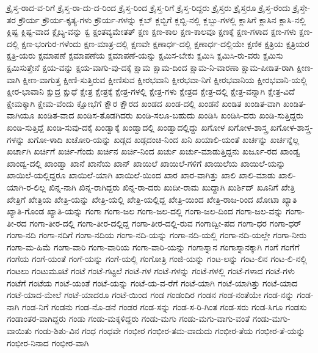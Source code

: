{ಕ್ರೈಸ್ತ-ರಾದ-ವ-ರಿಗೆ
ಕ್ರೈಸ್ತ-ರಾ-ದು-ದ-ರಿಂದ
ಕ್ರೈಸ್ತ-ರಿಂದ
ಕ್ರೈಸ್ತ-ರಿಗೆ
ಕ್ರೈಸ್ತ-ರಿದ್ದರು
ಕ್ರೈಸ್ತರು
ಕ್ರೈಸ್ತರೂ
ಕ್ರೈಸ್ತ-ರೆಂದು
ಕ್ರೈಸ್ತೇ-ತರ
ಕ್ರೌರ್ಯ
ಕ್ರೌರ್ಯ-ಕೃತ್ಯ-ಗಳು
ಕ್ರೌರ್ಯ-ಗಳನ್ನು
ಕ್ಲಬ್
ಕ್ಲಬ್ಬಿಗೆ
ಕ್ಲಬ್ಬಿ-ನಲ್ಲಿ
ಕ್ಲಬ್ಬು-ಗಳಲ್ಲಿ
ಕ್ಲಾಸಿಗೆ
ಕ್ಲಾಸಿನ
ಕ್ಲಾಸಿ-ನಲ್ಲಿ
ಕ್ಲಿಷ್ಟ
ಕ್ಲಿಷ್ಟ-ವಾದ
ಕ್ಲೈಬ್ಯ-ವನ್ನು
ಕ್ವ
ಕ್ಷಂತವ್ಯಮೇತತ್
ಕ್ಷಣ
ಕ್ಷಣ-ಕಾಲ
ಕ್ಷಣ-ಕಾಲವೂ
ಕ್ಷಣಕ್ಕೆ
ಕ್ಷಣ-ಗಳಾದ
ಕ್ಷಣ-ಗಳು
ಕ್ಷಣ-ದಲ್ಲಿ
ಕ್ಷಣ-ಭಂಗುರ-ಗಳೆಂದು
ಕ್ಷಣ-ಮಾತ್ರ-ದಲ್ಲಿ
ಕ್ಷಣವೇ
ಕ್ಷಣಾರ್ಧ-ದಲ್ಲಿ
ಕ್ಷಣಾರ್ಧ-ದಲ್ಲಿಯೇ
ಕ್ಷಣಿಕ
ಕ್ಷತ್ರಿಯ
ಕ್ಷತ್ರಿಯರ
ಕ್ಷತ್ರಿ-ಯರು
ಕ್ಷಮಾಪಣೆ
ಕ್ಷಮಾಪಣೆಯ
ಕ್ಷಮಾಪಣೆ-ಯನ್ನು
ಕ್ಷಮಿಸ-ಬೇಕು
ಕ್ಷಮಿಸಿ
ಕ್ಷಮಿಸಿ-ರು-ವರು
ಕ್ಷಮಿಸು
ಕ್ಷಮಿಸುತ್ತೇನೆ
ಕ್ಷಯ-ವನ್ನು
ಕ್ಷಯ-ವಾಗು-ವು-ದಕ್ಕೆ
ಕ್ಷಾಮ
ಕ್ಷಾಮ-ದಿಂದ
ಕ್ಷಾಮ-ನಿ-ವಾರಣಾ
ಕ್ಷಾಮ-ಪೀಡಿತ-ರಾಗಿ
ಕ್ಷೀಣ-ವಾಗಿ
ಕ್ಷೀಣ-ವಾಗುತ್ತ
ಕ್ಷೀಣಿ-ಸುತ್ತಿರುವ
ಕ್ಷೀಣಿಸುವ
ಕ್ಷೀರಭವಾನಿ
ಕ್ಷೀರಭವಾ-ನಿಗೆ
ಕ್ಷೀರಭವಾನಿಯ
ಕ್ಷೀರಭವಾನಿ-ಯಲ್ಲಿ
ಕ್ಷೀರ-ಭಾವಾನಿ
ಕ್ಷುದ್ರ
ಕ್ಷುಧೆ
ಕ್ಷೇತ್ರ
ಕ್ಷೇತ್ರಕ್ಕೆ
ಕ್ಷೇತ್ರ-ಗಳಲ್ಲಿ
ಕ್ಷೇತ್ರ-ಗಳು
ಕ್ಷೇತ್ರದ
ಕ್ಷೇತ್ರ-ದಲ್ಲಿ
ಕ್ಷೇತ್ರ-ವನ್ನಾಗಿ
ಕ್ಷೇತ್ರ-ವಿದೆ
ಕ್ಷೇಮಕ್ಕಾಗಿ
ಕ್ಷೇಮ-ವೆಂದು
ಕ್ಷೋಭೆಗೆ
ಕ್ಷೌರ
ಕ್ಷೌರದ
ಖಂಡದ
ಖಂಡ-ದಲ್ಲಿ
ಖಂಡನೆ
ಖಂಡಿತ
ಖಂಡಿತ-ವಾಗಿ
ಖಂಡಿತ-ವಾಗಿಯೂ
ಖಂಡಿತ-ವಾದ
ಖಂಡಿಸ-ತೊಡಗಿದರು
ಖಂಡಿ-ಸಲೂ-ಬಹುದು
ಖಂಡಿಸಿ
ಖಂಡಿಸಿ-ದರು
ಖಂಡಿ-ಸುತ್ತಿದ್ದರು
ಖಂಡಿ-ಸುತ್ತಿದ್ದೆ
ಖಂಡಿ-ಸುವು-ದಕ್ಕೆ
ಖಂಡ್ವಾಕ್ಕೆ
ಖಂಡ್ವಾದಲ್ಲಿ
ಖಂಡ್ವಾದಲ್ಲಿದ್ದು
ಖಗೋಳ
ಖಗೋಳ-ಶಾಸ್ತ್ರ
ಖಗೋಳ-ಶಾಸ್ತ್ರ-ಗಳನ್ನು
ಖಗೋ-ಳಾದಿ
ಖಚೋರಿ-ಯನ್ನು
ಖಡ್ಗದ
ಖಡ್ಗದಂಚಿ-ನಿಂದ
ಖನಿ
ಖಯಾಲಿ-ಯಂತೆ
ಖರ್ಚನ್ನು
ಖರ್ಚನ್ನೆಲ್ಲ
ಖರ್ಚಾಗಿ
ಖರ್ಚಿಗೆ
ಖರ್ಚಿ-ಗೆಂದು
ಖರ್ಚಿನ
ಖರ್ಚಿ-ನಿಂದ
ಖರ್ಚು
ಖರ್ಚು-ಮಾಡುತ್ತಿದ್ದನು
ಖರ್ಜೂ-ರದ
ಖಾಂಡ್ವ
ಖಾಂಡ್ವ-ದಲ್ಲಿ
ಖಾಂಡ್ವಾ
ಖಾನೆ
ಖಾನೆಯ
ಖಾನ್
ಖಾಯಿಲೆ
ಖಾಯಿಲೆ-ಗಳಿಗೆ
ಖಾಯಿಲೆಯ
ಖಾಯಿಲೆ-ಯನ್ನು
ಖಾಯಿಲೆ-ಯಲ್ಲಿದ್ದರೂ
ಖಾಯಿಲೆ-ಯಾಗಿ
ಖಾಯಿಲೆ-ಯಿಂದ
ಖಾರ
ಖಾರ-ವಾಗಿತ್ತು
ಖಾಲಿ
ಖಾಲಿ-ಮಾಡು
ಖಾಲಿ-ಯಾಗಿ-ರ-ಲಿಲ್ಲ
ಖಿನ್ನ-ನಾಗಿ
ಖಿನ್ನ-ರಾಗಿದ್ದರು
ಖಿನ್ನ-ರಾ-ದರು
ಖುದೀ-ರಾಮ
ಖುದ್ದಾಗಿ
ಖುರ್ಶಿದ್
ಖೂನಿಗೆ
ಖೇತ್ರಿ
ಖೇತ್ರಿಗೆ
ಖೇತ್ರಿಯ
ಖೇತ್ರಿ-ಯನ್ನು
ಖೇತ್ರಿ-ಯಲ್ಲಿ
ಖೇತ್ರಿ-ಯಲ್ಲಿದ್ದ
ಖೇತ್ರಿ-ಯಿಂದ
ಖೇತ್ರಿ-ರಾಜ-ರಿಂದ
ಖೋಟಾ
ಖ್ಯಾತಿ
ಖ್ಯಾತಿ-ಗೊಂಡ
ಖ್ಯಾತಿ-ಯನ್ನು
ಗಂಗಾ
ಗಂಗಾ-ಜಲ
ಗಂಗಾ-ಜಲ-ದಲ್ಲಿ
ಗಂಗಾ-ಜಲ-ದಿಂದ
ಗಂಗಾ-ಜಲ-ವನ್ನು
ಗಂಗಾ-ತೀ-ರದ
ಗಂಗಾ-ತೀರ-ದಲ್ಲಿ
ಗಂಗಾ-ತೀರ-ದಲ್ಲಿದ್ದ
ಗಂಗಾ-ತೀರ-ದಲ್ಲಿ-ರುವ
ಗಂಗಾದ್ವೀ-ಪದ
ಗಂಗಾ-ಧರ
ಗಂಗಾ-ಧರ್
ಗಂಗಾ-ನದಿ
ಗಂಗಾ-ನದಿಗೆ
ಗಂಗಾ-ನದಿಯ
ಗಂಗಾ-ನದಿ-ಯನ್ನು
ಗಂಗಾ-ನದಿ-ಯಲ್ಲಿ
ಗಂಗಾ-ನದಿ-ಯಲ್ಲೇ
ಗಂಗಾ-ನೀರು
ಗಂಗಾ-ಮ-ಹಿಮೆ
ಗಂಗಾ-ವಾರಿ
ಗಂಗಾ-ವಾರಿಯ
ಗಂಗಾ-ವಾರಿ-ಯನ್ನು
ಗಂಗಾಸ್ನಾನ
ಗಂಗಾಸ್ನಾನಕ್ಕಾಗಿ
ಗಂಗೆ
ಗಂಗೆಗೆ
ಗಂಗೆಯ
ಗಂಗೆ-ಯಂತೆ
ಗಂಗೆ-ಯನ್ನು
ಗಂಗೆ-ಯಲ್ಲಿ
ಗಂಗೋತ್ರಿ
ಗಂಜಿ-ಯನ್ನು
ಗಂಟ-ಲನ್ನು
ಗಂಟ-ಲಿನ
ಗಂಟ-ಲಿ-ನಲ್ಲಿ
ಗಂಟಲು
ಗಂಟುಮೂಟೆ
ಗಂಟೆ
ಗಂಟೆ-ಗಟ್ಟಲೆ
ಗಂಟೆ-ಗಳ
ಗಂಟೆ-ಗಳನ್ನು
ಗಂಟೆ-ಗಳಲ್ಲಿ
ಗಂಟೆ-ಗಳಾದ
ಗಂಟೆ-ಗಳು
ಗಂಟೆಗೆ
ಗಂಟೆಯ
ಗಂಟೆ-ಯಂತೆ
ಗಂಟೆ-ಯನ್ನು
ಗಂಟೆ-ಯ-ವ-ರೆಗೆ
ಗಂಟೆ-ಯಾಗಿ
ಗಂಟೆ-ಯಾಗಿತ್ತು
ಗಂಟೆ-ಯಾದ
ಗಂಟೆ-ಯಾದ-ಮೇಲೆ
ಗಂಟೆ-ಯಾದರೂ
ಗಂಟೆ-ಯಿಂದ
ಗಂಡ
ಗಂಡಂದಿರ
ಗಂಡನ
ಗಂಡ-ನಂತೆಯೇ
ಗಂಡ-ನನ್ನು
ಗಂಡ-ನಾಗಿ
ಗಂಡ-ನಿಗೆ
ಗಂಡನು
ಗಂಡ-ನೊ-ಡನೆ
ಗಂಡರ
ಗಂಡ-ಸನ್ನು
ಗಂಡ-ಸ-ರಿ-ಗಿಂತ
ಗಂಡ-ಸರು
ಗಂಡ-ಸಿಗೂ
ಗಂಡಸು
ಗಂಡಾಂತರ-ವಾಗಿದ್ದರು
ಗಂಡು
ಗಂಡು-ಮಕ್ಕಳಿದ್ದರು
ಗಂಡು-ಮಗು
ಗಂಡು-ಮಗು-ವಾಗು-ವಂತೆ
ಗಂಡು-ಮಗು-ವಾಯಿತು
ಗಂಡು-ಶಿಶು-ವಿನ
ಗಂಧ
ಗಂಧವೇ
ಗಂಭೀರ
ಗಂಭೀರ-ತಮ-ವಾದುದು
ಗಂಭೀರ-ತೆಯ
ಗಂಭೀರ-ತೆ-ಯನ್ನು
ಗಂಭೀರ-ನಿನಾದ
ಗಂಭೀರ-ವಾಗಿ
}
